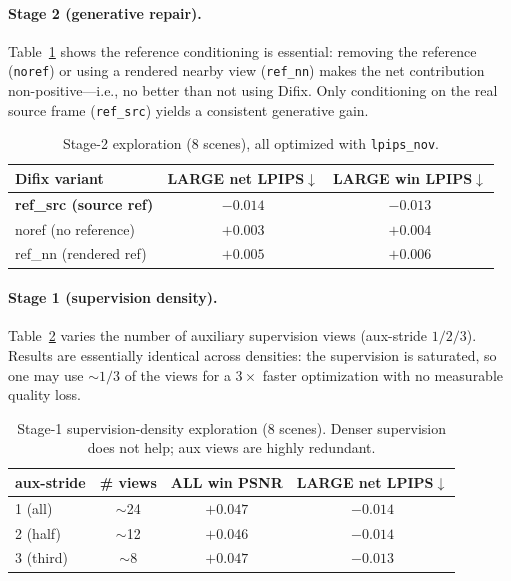 \documentclass[10pt,twocolumn,letterpaper]{article}
\begin{document}
\paragraph{Stage 2 (generative repair).}
Table~\ref{tab:stage2} shows the reference conditioning is essential: removing
the reference (\texttt{noref}) or using a rendered nearby view (\texttt{ref\_nn})
makes the net contribution non-positive---i.e., no better than not using Difix.
Only conditioning on the real source frame (\texttt{ref\_src}) yields a
consistent generative gain.

\begin{table}[t]
\centering
\small
\caption{Stage-2 exploration (8 scenes), all optimized with \texttt{lpips\_nov}.}
\label{tab:stage2}
\begin{tabular}{lcc}
\toprule
Difix variant & LARGE net LPIPS$\downarrow$ & LARGE win LPIPS$\downarrow$ \\
\midrule
\textbf{ref\_src (source ref)} & $\mathbf{-0.014}$ & $\mathbf{-0.013}$ \\
noref (no reference)           & $+0.003$ & $+0.004$ \\
ref\_nn (rendered ref)         & $+0.005$ & $+0.006$ \\
\bottomrule
\end{tabular}
\end{table}

\paragraph{Stage 1 (supervision density).}
Table~\ref{tab:stage1} varies the number of auxiliary supervision views
(aux-stride $1/2/3$). Results are essentially identical across densities: the
supervision is saturated, so one may use $\sim1/3$ of the views for a $3\times$
faster optimization with no measurable quality loss.

\begin{table}[t]
\centering
\small
\caption{Stage-1 supervision-density exploration (8 scenes). Denser supervision
does not help; aux views are highly redundant.}
\label{tab:stage1}
\begin{tabular}{lccc}
\toprule
aux-stride & \# views & ALL win PSNR & LARGE net LPIPS$\downarrow$ \\
\midrule
1 (all)    & $\sim$24 & $+0.047$ & $-0.014$ \\
2 (half)   & $\sim$12 & $+0.046$ & $-0.014$ \\
3 (third)  & $\sim$8  & $+0.047$ & $-0.013$ \\
\bottomrule
\end{tabular}
\end{table}
\end{document}
